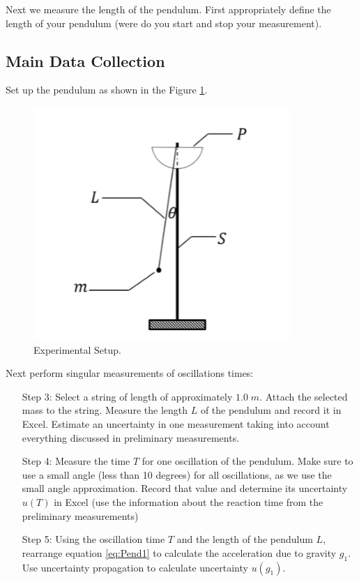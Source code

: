\documentclass[12pt, a4paper, oneside, openright, titlepage]{book}
\begin{document}
Next we measure the length of the pendulum. First appropriately define the length of your pendulum (were do you start and stop your measurement).

\subsection{Main Data Collection}

Set up the pendulum as shown in the Figure \ref{fig:Pend1}.

\begin{figure}[H]
    \centering
    \includegraphics[scale = 0.8]{Images/Pend1.PNG}
    \caption{Experimental Setup.}
    \label{fig:Pend1}
\end{figure}

Next perform singular measurements of oscillations times:


\begin{itemize}[leftmargin = 50pt]
    \item[Step 3:] Select a string of length of approximately $1.0\;m$. Attach the selected mass to the string. Measure the length $L$ of the pendulum and record it in Excel. Estimate an uncertainty in one measurement taking into account everything discussed in preliminary measurements.
    \item[Step 4:] Measure the time $T$ for one oscillation of the pendulum. Make sure to use a small angle (less than 10 degrees) for all oscillations, as we use the small angle approximation. Record that value and determine its uncertainty $u(T)$ in Excel (use the information about the reaction time from the preliminary measurements)
    \item[Step 5:] Using the oscillation time $T$ and the length of the pendulum $L$, rearrange equation \ref{eq:Pend1} to calculate the acceleration due to gravity $g_1$. Use uncertainty propagation to calculate uncertainty $u(g_1)$.
\end{itemize}
\end{document}
